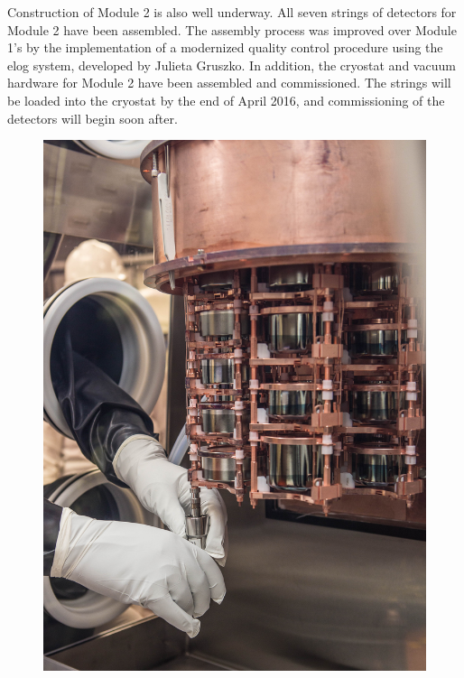 Construction of Module 2 is also well underway. All seven strings of detectors for Module 2 have been assembled. The assembly process was improved over Module 1's by the implementation of a modernized quality control procedure using the elog system, developed by Julieta Gruszko. In addition, the cryostat and vacuum hardware for Module 2 have been assembled and commissioned. The strings will be loaded into the cryostat by the end of April 2016, and commissioning of the detectors will begin soon after.

\begin{figure}[h]

\hfil  \includegraphics[width=.45\textwidth]{MJD_StringInstall.jpg} \hfil 


\label{MJD_StringInstall}  %

\end{figure}
